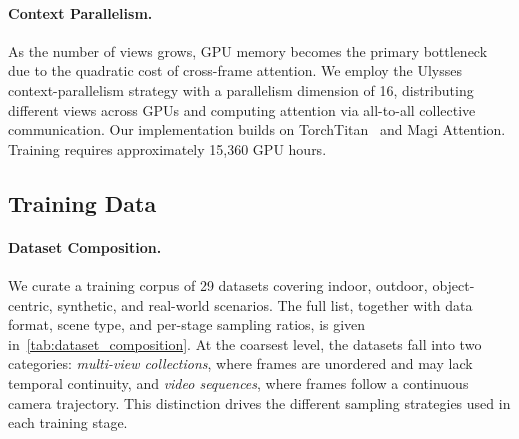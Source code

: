 \paragraph{Context Parallelism.}
As the number of views grows, GPU memory becomes the primary bottleneck
due to the quadratic cost of cross-frame attention.
We employ the Ulysses~\cite{jacobs2023deepspeed} context-parallelism
strategy with a parallelism dimension of 16, distributing different views
across GPUs and computing attention via all-to-all collective
communication.
Our implementation builds on TorchTitan~\cite{liang2025torchtitan} and
Magi Attention.
Training requires approximately 15,360 GPU hours.

\subsection{Training Data}
\label{sec:training_data}

\paragraph{Dataset Composition.}
We curate a training corpus of 29 datasets covering indoor, outdoor,
object-centric, synthetic, and real-world scenarios.
The full list, together with data format, scene type, and per-stage
sampling ratios, is given in~\cref{tab:dataset_composition}.
At the coarsest level, the datasets fall into two categories:
\emph{multi-view collections}, where frames are unordered and may lack
temporal continuity, and \emph{video sequences}, where frames follow a
continuous camera trajectory.
This distinction drives the different sampling strategies used in each
training stage.

